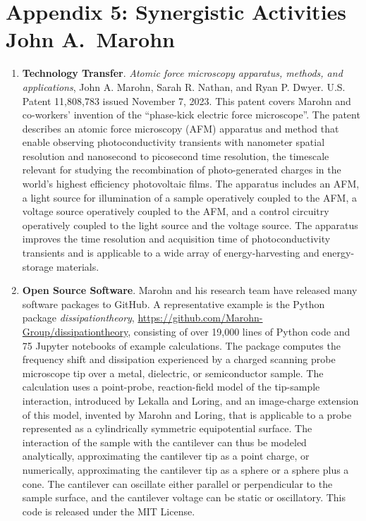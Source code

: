 \documentclass{NSF}
\begin{document}
\clearpage
\setcounter{page}{1}

\section*{Appendix 5: Synergistic Activities \hfill John A.\ Marohn}

\begin{enumerate}

\item {\bf Technology Transfer}.
\emph{Atomic force microscopy apparatus, methods, and applications}, John A. Marohn, Sarah R. Nathan, and Ryan P. Dwyer. U.S. Patent 11,808,783 issued November 7, 2023.
This patent covers Marohn and co-workers' invention of the ``phase-kick electric force microscope''.
The patent describes an atomic force microscopy (AFM) apparatus and method that enable observing photoconductivity transients with nanometer spatial resolution and nanosecond to picosecond time resolution, the timescale relevant for studying the recombination of photo-generated charges in the world's highest efficiency photovoltaic films.
The apparatus includes an AFM, a light source for illumination of a sample operatively coupled to the AFM, a voltage source operatively coupled to the AFM, and a control circuitry operatively coupled to the light source and the voltage source. 
The apparatus improves the time resolution and acquisition time of photoconductivity transients and is applicable to a wide array of energy-harvesting and energy-storage materials.

\item {\bf Open Source Software}.
Marohn and his research team have released many software packages to GitHub.
A representative example is the Python package \emph{dissipationtheory}, \url{https://github.com/Marohn-Group/dissipationtheory}, consisting of over 19,000 lines of Python code and 75 Jupyter notebooks of example calculations. 
The package computes the frequency shift and dissipation experienced by a charged scanning probe microscope tip over a metal, dielectric, or semiconductor sample. 
The calculation uses a point-probe, reaction-field model of the tip-sample interaction, introduced by Lekalla and Loring, and an image-charge extension of this model, invented by Marohn and Loring, that is applicable to a probe represented as a cylindrically symmetric equipotential surface.
The interaction of the sample with the cantilever can thus be modeled analytically, approximating the cantilever tip as a point charge, or numerically, approximating the cantilever tip as a sphere or a sphere plus a cone.
The cantilever can oscillate either parallel or perpendicular to the sample surface, and the cantilever voltage can be static or oscillatory.
This code is released under the MIT License.


\end{enumerate}
\end{document}
